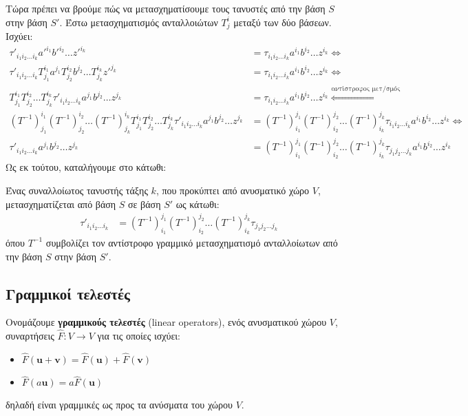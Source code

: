 \documentclass[main.tex]{subfiles}
\begin{document}
	Τώρα πρέπει να βρούμε πώς να μετασχηματίσουμε τους τανυστές από την βάση $S$ στην βάση $S'$. Έστω μετασχηματισμός ανταλλοιώτων $T^i_j$ μεταξύ των δύο βάσεων. Ισχύει:
	\begin{align*}
		\tau'_{i_1i_2\ldots i_k}a'^{i_1}b'^{i_2}\ldots z'^{i_k} &= \tau_{i_1i_2\ldots i_k}a^{i_1}b^{i_2}\ldots z^{i_k} \Leftrightarrow \\
		\tau'_{i_1i_2\ldots i_k}T^{i_1}_{j_1}a^{j_1}T^{i_2}_{j_2}b^{j_2}\ldots T^{i_k}_{j_k}z'^{j_k} &=  \tau_{i_1i_2\ldots i_k}a^{i_1}b^{i_2}\ldots z^{i_k} \Leftrightarrow \\
		T^{i_1}_{j_1}T^{i_2}_{j_2}\ldots T^{i_k}_{j_k}\tau'_{i_1i_2\ldots i_k}a^{j_1}b^{j_2}\ldots z^{j_k} &= \tau_{i_1i_2\ldots i_k}a^{i_1}b^{i_2}\ldots z^{i_k} \overset{\text{αντίστροφος μετ/σμός}}{\Leftrightarrow}\\
		(T^{-1})^{i_1}_{j_1}(T^{-1})^{i_2}_{j_2}\ldots(T^{-1})^{i_k}_{j_k}T^{i_1}_{j_1}T^{i_2}_{j_2}\ldots T^{i_k}_{j_k}\tau'_{i_1i_2\ldots i_k}a^{j_1}b^{j_2}\ldots z^{j_k} &= (T^{-1})^{j_1}_{i_1}(T^{-1})^{j_2}_{i_2}\ldots(T^{-1})^{j_k}_{i_k}\tau_{i_1i_2\ldots i_k}a^{i_1}b^{i_2}\ldots z^{i_k}\Leftrightarrow\\
		\tau'_{i_1i_2\ldots i_k}a^{j_1}b^{j_2}\ldots z^{j_k} &= (T^{-1})^{j_1}_{i_1}(T^{-1})^{j_2}_{i_2}\ldots(T^{-1})^{j_k}_{i_k}\tau_{j_1j_2\ldots j_k}a^{i_1}b^{i_2}\ldots z^{i_k}
	\end{align*}
	Ως εκ τούτου, καταλήγουμε στο κάτωθι:
	\begin{theorem}
		Ένας συναλλοίωτος τανυστής τάξης $k$, που προκύπτει από ανυσματικό χώρο $V$, μετασχηματίζεται από βάση $S$ σε βάση $S'$ ως κάτωθι:
		\begin{align*}
			\tau'_{i_1i_2\ldots i_k} &= (T^{-1})^{j_1}_{i_1}(T^{-1})^{j_2}_{i_2}\ldots(T^{-1})^{j_k}_{i_k}\tau_{j_1j_2\ldots j_k}
		\end{align*}
		όπου $T^{-1}$ συμβολίζει τον αντίστροφο γραμμικό μετασχηματισμό ανταλλοίωτων από την βάση $S$ στην βάση $S'$.
	\end{theorem}

	\subsection{Γραμμικοί τελεστές}
	
	\begin{definition}
		Ονομάζουμε \textbf{γραμμικούς τελεστές} (linear operators), ενός ανυσματικού χώρου $V$, συναρτήσεις ${\hat{F}:V\rightarrow V}$ για τις οποίες ισχύει:
		\begin{itemize}
			\item $\hat{F}(\boldsymbol{u} + \boldsymbol{v}) = \hat{F}(\boldsymbol{u}) + \hat{F}(\boldsymbol{v})$ 
			\item $\hat{F}(a\boldsymbol{u}) = a\hat{F}(\boldsymbol{u})$
		\end{itemize}
		δηλαδή είναι γραμμικές ως προς τα ανύσματα του χώρου $V$.
	\end{definition}
\end{document}
